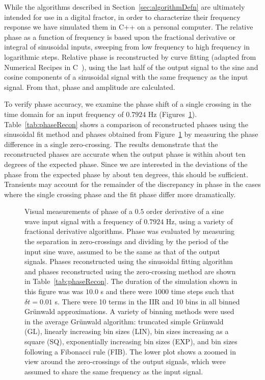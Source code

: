 While the algorithms described in Section~\ref{sec:algorithmDefn} are
ultimately intended for use in a digital fractor, in order to
characterize their frequency response we have simulated them in C++ on a
personal computer. The relative phase as a function of frequency is based upon the
fractional derivative or integral of sinusoidal inputs, sweeping from
low frequency to high frequency in logarithmic steps. Relative phase
is reconstructed by curve fitting (adapted from Numerical Recipes in C~\cite{Press:92}), using the last
half of the output signal to the sine and cosine components of a
sinusoidal signal with the same frequency as the input signal. From that, phase and amplitude are calculated.

To verify phase accuracy, we examine the phase shift of a single
crossing in the time domain for an input frequency of $0.7924$ Hz
(Figures~\ref{fig:timeDomain}). Table~\ref{tab:phaseRecon}
shows a comparison of reconstructed phases using the sinusoidal fit
method and phases obtained from Figure~\ref{fig:timeDomain} by
measuring the phase difference in a single zero-crossing. The results demonstrate that the reconstructed phases are accurate when the output phase is within about ten degrees of the expected phase. Since we are interested in the deviations of the phase from the expected phase by about ten degrees, this should be sufficient. Transients may account for the remainder of the discrepancy in phase in the cases where the single crossing phase and the fit phase differ more dramatically. 


\begin{figure}
\caption{Visual measurements of phase of a $0.5$ order derivative of a sine wave input signal with a frequency of $0.7924$ Hz, using a variety of fractional derivative algorithms. Phase was evaluated by measuring the separation in zero-crossings and dividing by the period of the input sine wave, assumed to be the same as that of the output signals. Phases reconstructed using the sinusoidal fitting algorithm and phases reconstructed using the zero-crossing method are shown in Table~\ref{tab:phaseRecon}. The duration of the simulation shown in this figure was 
  was $10.0$ s and there were $1000$ time steps such that $\delta t=0.01$ s. There were 10 terms
  in the IIR and 10 bins in all binned Gr{\"u}nwald approximations. A
  variety of binning methods were used in the average Gr{\"u}nwald algorithm: truncated simple Gr{\"u}nwald
  (GL), linearly increasing bin sizes (LIN), bin sizes increasing as a
  square (SQ), exponentially increasing bin sizes (EXP), and bin sizes
  following a Fibonacci rule (FIB). The lower plot shows a zoomed in view around the zero-crossings of the output signals, which were assumed to share the same frequency as the input signal.}
\label{fig:timeDomain}
\end{figure}


